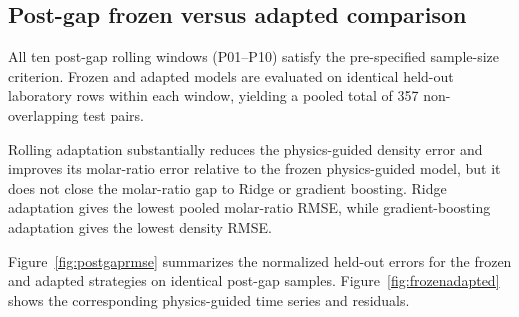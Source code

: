 \documentclass[11pt]{article}
\begin{document}
\subsection{Post-gap frozen versus adapted comparison}

All ten post-gap rolling windows (P01--P10) satisfy the pre-specified sample-size criterion. Frozen and adapted models are evaluated on identical held-out laboratory rows within each window, yielding a pooled total of 357 non-overlapping test pairs.

\begin{table}[htbp]
\centering
\caption{Post-gap rolling comparison on identical held-out samples (10 windows, 357 pooled test pairs).}
\label{tab:postgapcomparison}
\end{table}

Rolling adaptation substantially reduces the physics-guided density error and improves its molar-ratio error relative to the frozen physics-guided model, but it does not close the molar-ratio gap to Ridge or gradient boosting. Ridge adaptation gives the lowest pooled molar-ratio RMSE, while gradient-boosting adaptation gives the lowest density RMSE.

Figure~\ref{fig:postgaprmse} summarizes the normalized held-out errors for the frozen and adapted strategies on identical post-gap samples. Figure~\ref{fig:frozenadapted} shows the corresponding physics-guided time series and residuals.
\end{document}
